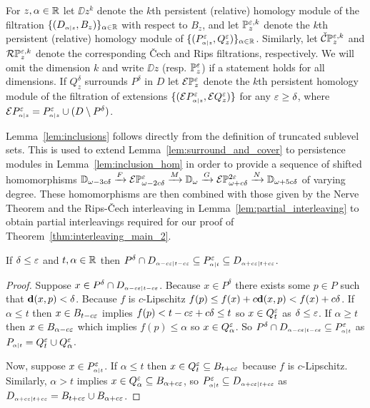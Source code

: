
For $z,\alpha\in\R$ let $\DD{z}^k$ denote the $k$th persistent (relative) homology module of the filtration $\{(D\subi{z}{\alpha},B_z)\}_{\alpha\in\R}$ with respect to $B_z$, and let $\PP{z}{\e,k}$ denote the $k$th persistent (relative) homology module of $\{(P\subi{z}{\alpha}^\e,Q_z^\e)\}_{\alpha\in\R}$.
Similarly, let $\CPP{z}{\e,k}$ and $\RPP{z}{\e,k}$ denote the corresponding \v Cech and Rips filtrations, respectively.
We will omit the dimension $k$ and write $\DD{z}$ (resp. $\PP{z}{\e}$) if a statement holds for all dimensions.
If $Q_z^\delta$ surrounds $P^\delta$ in $D$ let $\ext{\PP{z}{\e}}$ denote the $k$th persistent homology module of the filtration of extensions $\{(\ext{P\subi{z}{\alpha}^\e},\ext{Q_z^\e})\}$ for any $\e\geq\delta$, where $\ext{P\subi{z}{\alpha}^\e} = P\subi{z}{\alpha}^\e \cup (D\setminus P^\delta)$.

Lemma~\ref{lem:inclusions} follows directly from the definition of truncated sublevel sets.
This is used to extend Lemma~\ref{lem:surround_and_cover} to persistence modules in Lemma~\ref{lem:inclusion_hom} in order to provide a sequence of shifted homomorphisms $\DD{\omega-3c\delta}\xrightarrow{F}\E\PP{\omega-2c\delta}{\e}\xrightarrow{M}\DD{\omega}\xrightarrow{G}\E\PP{\omega+c\delta}{2\e}\xrightarrow{N}\DD{\omega+5c\delta}$ of varying degree.
These homomorphisms are then combined with those given by the Nerve Theorem and the Rips-\v Cech interleaving in Lemma~\ref{lem:partial_interleaving} to obtain partial interleavings required for our proof of Theorem~\ref{thm:interleaving_main_2}.

\begin{lemma}\label{lem:inclusions}
  If $\delta\leq\e$ and $t,\alpha\in\R$ then $P^\delta\cap D\subi{t-c\e}{\alpha-c\e}\subseteq P\subi{t}{\alpha}^\e\subseteq D\subi{t+c\e}{\alpha+c\e}$.
\end{lemma}
\begin{proof}
  Suppose $x\in P^\delta\cap D\subi{t-c\e}{\alpha-c\e}$.
  Because $x\in P^\delta$ there exists some $p\in P$ such that $\dist(x,p) < \delta$.
  Because $f$ is $c$-Lipschitz $f(p)\leq f(x) + c\dist(x,p) < f(x) + c\delta$.
  If $\alpha\leq t$ then $x\in B_{t-c\e}$ implies $f(p) < t-c\e + c\delta \leq t$ so $x\in Q_t^\e$ as $\delta\leq\e$.
  If $\alpha\geq t$ then $x\in B_{\alpha-c\e}$ which implies $f(p) \leq \alpha$ so $x\in Q_\alpha^\e$.
  So $P^\delta\cap D\subi{t-c\e}{\alpha-c\e}\subseteq P\subi{t}{\alpha}^\e$ as $P\subi{t}{\alpha} = Q_t^\e\cup Q_\alpha^\e$.

  Now, suppose $x\in P\subi{t}{\alpha}^\e$.
  If $\alpha\leq t$ then $x\in Q_t^\e\subseteq B_{t+c\e}$ because $f$ is $c$-Lipschitz.
  Similarly, $\alpha > t$ implies $x\in Q_\alpha^\e\subseteq B_{\alpha+c\e}$, so $P\subi{t}{\alpha}^\e\subseteq D\subi{t+c\e}{\alpha+c\e}$ as $D\subi{t+c\e}{\alpha+c\e} = B_{t+c\e}\cup B_{\alpha+c\e}$.
\end{proof}

